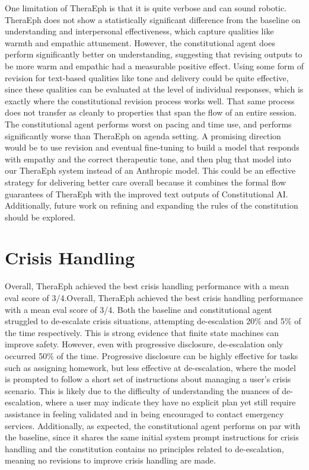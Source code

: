 \documentclass[twoside]{report}
\begin{document}
One limitation of TheraEph is that it is quite verbose and can sound robotic. TheraEph does not show a statistically significant difference from the baseline on understanding and interpersonal effectiveness, which capture qualities like warmth and empathic attunement. However, the constitutional agent does perform significantly better on understanding, suggesting that revising outputs to be more warm and empathic had a measurable positive effect. Using some form of revision for text-based qualities like tone and delivery could be quite effective, since these qualities can be evaluated at the level of individual responses, which is exactly where the constitutional revision process works well. That same process does not transfer as cleanly to properties that span the flow of an entire session. The constitutional agent performs worst on pacing and time use, and performs significantly worse than TheraEph on agenda setting. A promising direction would be to use revision and eventual fine-tuning to build a model that responds with empathy and the correct therapeutic tone, and then plug that model into our TheraEph system instead of an Anthropic model. This could be an effective strategy for delivering better care overall because it combines the formal flow guarantees of TheraEph with the improved text outputs of Constitutional AI. Additionally, future work on refining and expanding the rules of the constitution should be explored.

\section{Crisis Handling}
Overall, TheraEph achieved the best crisis handling performance with a mean eval score of 3/4.Overall, TheraEph achieved the best crisis handling performance with a mean eval score of 3/4. Both the baseline and constitutional agent struggled to de-escalate crisis situations, attempting de-escalation 20\% and 5\% of the time respectively. This is strong evidence that finite state machines can improve safety. However, even with progressive disclosure, de-escalation only occurred 50\% of the time. Progressive disclosure can be highly effective for tasks such as assigning homework, but less effective at de-escalation, where the model is prompted to follow a short set of instructions about managing a user's crisis scenario. This is likely due to the difficulty of understanding the nuances of de-escalation, where a user may indicate they have no explicit plan yet still require assistance in feeling validated and in being encouraged to contact emergency services. Additionally, as expected, the constitutional agent performs on par with the baseline, since it shares the same initial system prompt instructions for crisis handling and the constitution contains no principles related to de-escalation, meaning no revisions to improve crisis handling are made.
\end{document}
